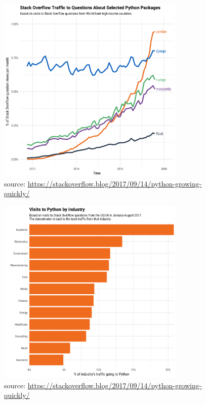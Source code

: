 \begin{frame}[c]
\begin{figure}[tb]
    \centering
    \includegraphics[width=0.8\textwidth, height=0.8\textheight]{../material/fig-pandas-growth}
    \caption{source: \url{https://stackoverflow.blog/2017/09/14/python-growing-quickly/}}
    \label{fig:pandas-growth}
\end{figure}
\end{frame}

\begin{frame}[c]
\begin{figure}[tb]
    \centering
    \includegraphics[width=0.8\textwidth, height=0.8\textheight]{../material/fig-pandas-visitors-by-industry}
    \caption{source: \url{https://stackoverflow.blog/2017/09/14/python-growing-quickly/}}
    \label{fig:figure1}
\end{figure}
\end{frame}

